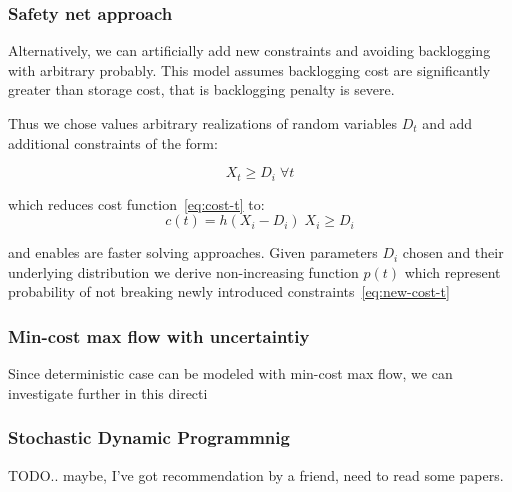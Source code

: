 \subsubsection{Safety net approach}
\label{subs:Safety net approach}

Alternatively, we can artificially add new constraints and avoiding backlogging with arbitrary probably. This model assumes backlogging cost are significantly greater than storage cost, that is backlogging penalty is severe.

Thus we chose values arbitrary realizations of random variables $D_t$ and add additional constraints of the form:

\begin{equation}
    \label{eq:new-cost-t}
    X_t \ge D_i \; \forall t
\end{equation}

which reduces cost function~\ref{eq:cost-t} to:
\[
c(t) = h \left( X_i - D_i \right) \; X_i \ge D_i
\]

and enables are faster solving approaches. Given parameters $D_i$ chosen and their underlying distribution we derive non-increasing function $p(t)$ which represent probability of not breaking newly introduced constraints~\ref{eq:new-cost-t}

\subsubsection{Min-cost max flow with uncertaintiy}
\label{subs:Min-cost max flow with uncertaintiy}

Since deterministic case can be modeled with min-cost max flow, we can investigate further in this directi

\subsubsection{Stochastic Dynamic Programmnig}
\label{subs:SDP}

TODO.. maybe, I've got recommendation by a friend, need to read some papers.
